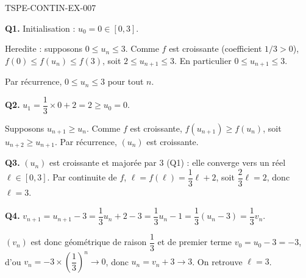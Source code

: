 \begin{corrige}{TSPE-CONTIN-EX-007}

\textbf{Q1.} Initialisation : $u_0 = 0 \in [0,3]$.

Heredite : supposons $0 \leq u_n \leq 3$. Comme $f$ est croissante (coefficient $1/3>0$), $f(0) \leq f(u_n) \leq f(3)$, soit $2 \leq u_{n+1} \leq 3$. En particulier $0 \leq u_{n+1} \leq 3$.

Par récurrence, $0 \leq u_n \leq 3$ pour tout $n$.

\textbf{Q2.} $u_1 = \dfrac{1}{3}\times 0 + 2 = 2 \geq u_0 = 0$.

Supposons $u_{n+1} \geq u_n$. Comme $f$ est croissante, $f(u_{n+1}) \geq f(u_n)$, soit $u_{n+2} \geq u_{n+1}$. Par récurrence, $(u_n)$ est croissante.

\textbf{Q3.} $(u_n)$ est croissante et majorée par $3$ (Q1) : elle converge vers un réel $\ell \in [0,3]$. Par continuite de $f$, $\ell = f(\ell) = \dfrac{1}{3}\ell + 2$, soit $\dfrac{2}{3}\ell = 2$, donc $\boxed{\ell = 3}$.

\textbf{Q4.} $v_{n+1} = u_{n+1} - 3 = \dfrac{1}{3}u_n + 2 - 3 = \dfrac{1}{3}u_n - 1 = \dfrac{1}{3}(u_n - 3) = \dfrac{1}{3}v_n$.

$(v_n)$ est donc géométrique de raison $\dfrac{1}{3}$ et de premier terme $v_0 = u_0 - 3 = -3$, d'ou $v_n = -3 \times \left(\dfrac{1}{3}\right)^n \to 0$, donc $u_n = v_n + 3 \to 3$. On retrouve $\ell = 3$.

\end{corrige}
